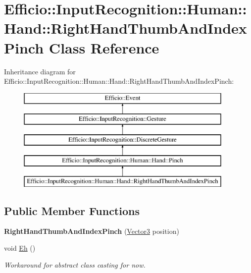 \hypertarget{class_efficio_1_1_input_recognition_1_1_human_1_1_hand_1_1_right_hand_thumb_and_index_pinch}{}\section{Efficio\+:\+:Input\+Recognition\+:\+:Human\+:\+:Hand\+:\+:Right\+Hand\+Thumb\+And\+Index\+Pinch Class Reference}
\label{class_efficio_1_1_input_recognition_1_1_human_1_1_hand_1_1_right_hand_thumb_and_index_pinch}
Inheritance diagram for Efficio\+:\+:Input\+Recognition\+:\+:Human\+:\+:Hand\+:\+:Right\+Hand\+Thumb\+And\+Index\+Pinch\+:\begin{figure}[H]
\begin{center}
\leavevmode
\includegraphics[height=5.000000cm]{class_efficio_1_1_input_recognition_1_1_human_1_1_hand_1_1_right_hand_thumb_and_index_pinch}
\end{center}
\end{figure}
\subsection*{Public Member Functions}
\begin{DoxyCompactItemize}
\item 
{\bfseries Right\+Hand\+Thumb\+And\+Index\+Pinch} (\hyperlink{class_efficio_1_1_vector3}{Vector3} position)\hypertarget{class_efficio_1_1_input_recognition_1_1_human_1_1_hand_1_1_right_hand_thumb_and_index_pinch_a437d7b9c736b7aa23115d57b3a78c81a}{}\label{class_efficio_1_1_input_recognition_1_1_human_1_1_hand_1_1_right_hand_thumb_and_index_pinch_a437d7b9c736b7aa23115d57b3a78c81a}

\item 
void \hyperlink{class_efficio_1_1_input_recognition_1_1_human_1_1_hand_1_1_right_hand_thumb_and_index_pinch_a4628b019fc37ee3f9aa34751293bd46a}{Eh} ()\hypertarget{class_efficio_1_1_input_recognition_1_1_human_1_1_hand_1_1_right_hand_thumb_and_index_pinch_a4628b019fc37ee3f9aa34751293bd46a}{}\label{class_efficio_1_1_input_recognition_1_1_human_1_1_hand_1_1_right_hand_thumb_and_index_pinch_a4628b019fc37ee3f9aa34751293bd46a}

\begin{DoxyCompactList}\small\item\em Workaround for abstract class casting for now. \end{DoxyCompactList}\end{DoxyCompactItemize}
